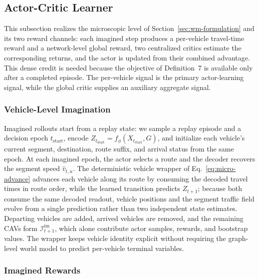 \subsection{Actor-Critic Learner}

This subsection realizes the microscopic level of
Section~\ref{sec:wm-formulation} and its two reward channels: each imagined
step produces a per-vehicle travel-time reward and a network-level global
reward, two centralized critics estimate the corresponding returns, and the
actor is updated from their combined advantage.  This dense credit is
needed because the objective of Definition~7 is available only after a
completed episode.  The per-vehicle signal is
the primary actor-learning signal, while the global critic supplies an
auxiliary aggregate signal.

\subsubsection{Vehicle-Level Imagination}

Imagined rollouts start from a replay state: we sample a replay episode and
a decision epoch \(t_{\mathrm{start}}\), encode
\(Z_{t_{\mathrm{start}}}=f_\phi(X_{t_{\mathrm{start}}},G)\), and initialize
each vehicle's current segment, destination, route suffix, and arrival
status from the same epoch.  At each imagined epoch, the actor selects a
route and the decoder recovers the segment speed \(\widehat v_{t,u}\).  The
deterministic vehicle wrapper of Eq.~\ref{eq:micro-advance} advances each
vehicle along its route by consuming the decoded travel times in route
order, while the learned transition predicts \(Z_{t+1}\); because both
consume the same decoded readout, vehicle positions and the segment traffic
field evolve from a single prediction rather than two independent state
estimates.  Departing vehicles are added, arrived vehicles are removed, and
the remaining CAVs form \(\mathcal{I}_{t+1}^{\mathrm{im}}\), which alone
contribute actor samples, rewards, and bootstrap values.  The wrapper keeps
vehicle identity explicit without requiring the graph-level world model to
predict per-vehicle terminal variables.

\subsubsection{Imagined Rewards}

